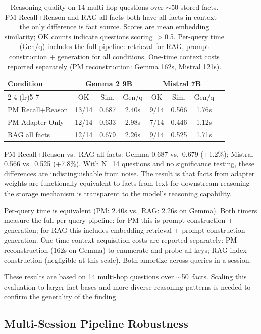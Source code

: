 \documentclass[11pt]{article}
\begin{document}
\begin{table}[t]
\centering
\caption{Reasoning quality on 14 multi-hop questions over $\sim$50 stored facts. PM Recall+Reason and RAG all facts both have all facts in context---the only difference is fact source. Scores are mean embedding similarity; OK counts indicate questions scoring $>$0.5. Per-query time (Gen/q) includes the full pipeline: retrieval for RAG, prompt construction + generation for all conditions. One-time context costs reported separately (PM reconstruction: Gemma 162s, Mistral 121s).}
\label{tab:inference}
\small
\begin{tabular}{lccccccc}
\toprule
Condition & \multicolumn{3}{c}{Gemma 2 9B} & \multicolumn{3}{c}{Mistral 7B} \\
\cmidrule(lr){2-4} \cmidrule(lr){5-7}
 & OK & Sim. & Gen/q & OK & Sim. & Gen/q \\
\midrule
PM Recall+Reason & 13/14 & 0.687 & 2.40s & 9/14 & 0.566 & 1.76s \\
PM Adapter-Only & 12/14 & 0.633 & 2.98s & 7/14 & 0.446 & 1.12s \\
RAG all facts & 12/14 & 0.679 & 2.26s & 9/14 & 0.525 & 1.71s \\
\bottomrule
\end{tabular}
\end{table}
PM Recall+Reason vs.\ RAG all facts: Gemma 0.687 vs.\ 0.679 (+1.2\%); Mistral 0.566 vs.\ 0.525 (+7.8\%).
With N=14 questions and no significance testing, these differences are indistinguishable from noise.
The result is that facts from adapter weights are functionally equivalent to facts from text for downstream reasoning---the storage mechanism is transparent to the model's reasoning capability.

Per-query time is equivalent (PM: 2.40s vs.\ RAG: 2.26s on Gemma).
Both timers measure the full per-query pipeline: for PM this is prompt construction + generation; for RAG this includes embedding retrieval + prompt construction + generation.
One-time context acquisition costs are reported separately: PM reconstruction (162s on Gemma) to enumerate and probe all keys; RAG index construction (negligible at this scale).
Both amortize across queries in a session.

These results are based on 14 multi-hop questions over $\sim$50~facts.
Scaling this evaluation to larger fact bases and more diverse reasoning patterns is needed to confirm the generality of the finding.

\subsection{Multi-Session Pipeline Robustness}
\label{sec:exp-reinforcement}
\end{document}
